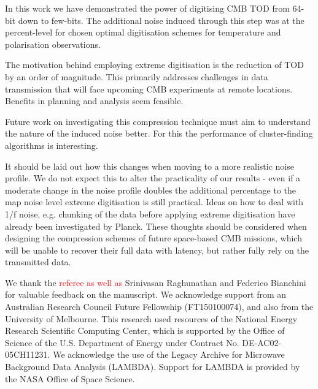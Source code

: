 \documentclass[apj]{emulateapj}
\newcommand{\changed}[1]{\textcolor{Red}{#1}}
\begin{document}
In this work we have demonstrated the power of digitising CMB TOD from 64-bit down to few-bits. The additional noise induced through this step was at the percent-level for chosen optimal digitisation schemes for temperature and polarisation observations.

The motivation behind employing extreme digitisation is the reduction of TOD by an order of magnitude. This primarily addresses challenges in data transmission that will face upcoming CMB experiments at remote locations. Benefits in planning and analysis seem feasible.

Future work on investigating this compression technique must aim to understand the nature of the induced noise better. For this the performance of cluster-finding algorithms is interesting.

It should be laid out how this changes when moving to a more realistic noise profile. We do not expect this to alter the practicality of our results - even if a moderate change in the noise profile doubles the additional percentage to the map noise level extreme digitisation is still practical. Ideas on how to deal with 1/f noise, e.g. chunking of the data before applying extreme digitisation have already been investigated by Planck. These thoughts should be considered when designing the compression schemes of future space-based CMB missions, which will be unable to recover their full data with latency, but rather fully rely on the transmitted data.

\acknowledgments %

We thank the \changed{referee as well as} Srinivasan Raghunathan and Federico Bianchini for valuable feedback on the manuscript. 
We acknowledge support from an Australian Research Council Future Fellowship (FT150100074), and also from the University of Melbourne. 
This research used resources of the National Energy Research Scientific Computing Center, which is supported by the Office of Science of the U.S. Department of Energy under Contract No. DE-AC02-05CH11231. 
We acknowledge the use of the Legacy Archive for Microwave Background Data Analysis (LAMBDA). Support for LAMBDA is provided by the NASA Office of Space Science.



\end{document}
